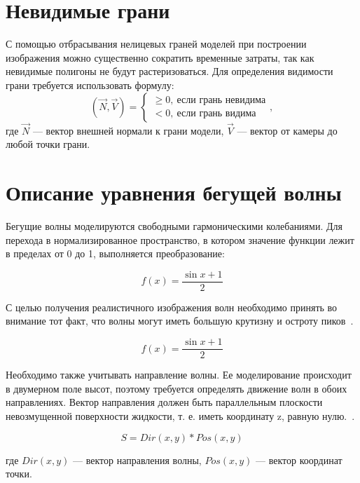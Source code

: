 \section{Невидимые грани}
С помощью отбрасывания нелицевых граней моделей при построении изображения можно существенно сократить временные затраты, так как невидимые полигоны не будут растеризоваться.
Для определения видимости грани требуется использовать формулу:
\begin{equation}
	(\overrightarrow{N}, \overrightarrow{V}) = \begin{cases}
		 \geq 0,~\text{если грань невидима} \\
		 < 0,~\text{если грань видима}
	\end{cases},
\end{equation}
где $\overrightarrow{N}$ --- вектор внешней нормали к грани модели, $\overrightarrow{V}$ --- вектор от камеры до любой точки грани.


\section{Описание уравнения бегущей волны}
Бегущие волны моделируются свободными гармоническими колебаниями. 
Для перехода в нормализированное пространство, в котором значение функции лежит в пределах от 0 до 1, 
выполняется преобразование:

\begin{equation}
    f(x) = \dfrac{\sin{x} + 1}{2}
\end{equation}

С целью получения реалистичного изображения волн необходимо принять во внимание тот факт, 
что волны могут иметь большую крутизну и остроту пиков~\cite{WAVE}.

\begin{equation}
    f(x) = \dfrac{\sin{x} + 1}{2}
\end{equation}

Необходимо также учитывать направление волны. Ее моделирование происходит в двумерном поле высот, 
поэтому требуется определять движение волн в обоих направлениях. Вектор направления должен быть 
параллельным плоскости невозмущенной поверхности жидкости, т. е. иметь координату z, равную нулю.~\cite{WAVE}.

\begin{equation}
    S = Dir(x,y)*Pos(x,y)
\end{equation}

где $Dir(x, y)$ — вектор направления волны, $Pos(x, y)$ — вектор координат точки.

